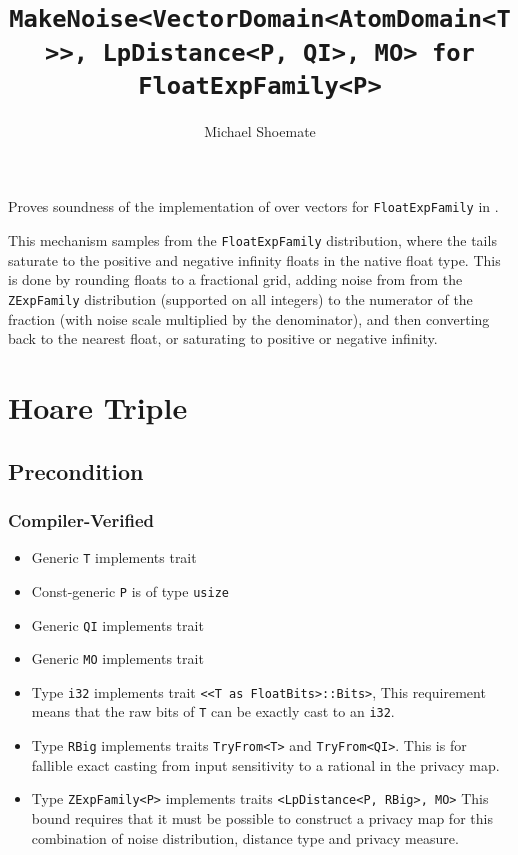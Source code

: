 \documentclass{article}
\title{\texttt{MakeNoise<VectorDomain<AtomDomain<T>>, LpDistance<P, QI>, MO> for FloatExpFamily<P>}}
\author{Michael Shoemate}
\date{}
\begin{document}
\maketitle

\contrib
Proves soundness of the implementation of  over vectors
for \texttt{FloatExpFamily} in .

This mechanism samples from the \texttt{FloatExpFamily} distribution, 
where the tails saturate to the positive and negative infinity floats in the native float type.
This is done by rounding floats to a fractional grid, 
adding noise from from the \texttt{ZExpFamily} distribution (supported on all integers) 
to the numerator of the fraction (with noise scale multiplied by the denominator),
and then converting back to the nearest float, or saturating to positive or negative infinity.

\section{Hoare Triple}
\subsection*{Precondition}
\subsubsection*{Compiler-Verified}

\begin{itemize}
    \item Generic \texttt{T} implements trait 
    \item Const-generic \texttt{P} is of type \texttt{usize}
    \item Generic \texttt{QI} implements trait 
    \item Generic \texttt{MO} implements trait 
    \item Type \texttt{i32} implements trait \texttt{<<T as FloatBits>::Bits>},
        This requirement means that the raw bits of \texttt{T} can be exactly cast to an \texttt{i32}.
    \item Type \texttt{RBig} implements traits \texttt{TryFrom<T>} and \texttt{TryFrom<QI>}.
        This is for fallible exact casting from input sensitivity to a rational in the privacy map.
    \item Type \texttt{ZExpFamily<P>} implements traits \texttt{<LpDistance<P, RBig>, MO>}
        This bound requires that it must be possible to construct a privacy map for this combination of noise distribution, distance type and privacy measure.
\end{itemize}
\end{document}
